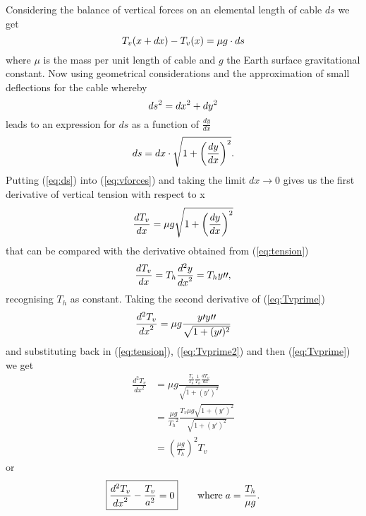 \documentclass[11pt]{amsart}
\begin{document}
Considering the balance of vertical forces on an elemental length of cable $ds$ we get
\begin{equation}
	\centering
	T_{v}(x+dx) - T_{v}(x) = \mu g \cdot ds
	\label{eq:vforces}
\end{equation}
where $\mu$ is the mass per unit length of cable and $g$ the Earth surface gravitational constant. Now
using geometrical considerations and the approximation of small deflections for the cable whereby
\begin{equation}
	\centering
	ds^2=dx^2+dy^2
	\label{eq:elemental}
\end{equation}
leads to an expression for $ds$ as a function of $\frac{dy}{dx}$
\begin{equation}
	\centering
	ds = dx \cdot \sqrt{1 + \left(\frac{dy}{dx}\right)^2}.
	\label{eq:ds}
\end{equation}
Putting (\ref{eq:ds}) into (\ref{eq:vforces}) and taking the limit $dx \to 0$ gives us the first derivative of vertical tension with respect to x
\begin{equation}
	\centering
	\frac{dT_{v}}{dx} = \mu g \sqrt{1 + \left(\frac{dy}{dx}\right)^2}
	\label{eq:Tvprime}
\end{equation}
that can be compared with the derivative obtained from (\ref{eq:tension})
\begin{equation}
	\centering
	\frac{dT_{v}}{dx} = T_{h} \frac{d^{2}y}{{dx}^2} = T_h y \prime \prime,
	\label{eq:Tvprime2}
\end{equation}
recognising $T_h$ as constant. Taking the second derivative of (\ref{eq:Tvprime})
\begin{equation}
	\centering
	\frac{d^{2}T_{v}}{{dx}^2} = \mu g \frac{y \prime y \prime \prime}{\sqrt{1 + (y \prime)^2}}
	\label{eq:Tvprimeprime}
\end{equation}
and substituting back in (\ref{eq:tension}), (\ref{eq:Tvprime2}) and then (\ref{eq:Tvprime}) we get
\begin{align*}
\frac{d^{2}T_{v}}{{dx}^2} &= \mu g \frac{\frac{T_v}{T_h} \frac{1}{T_h}\frac{dT_{v}}{dx}}{\sqrt{1 + (y \prime)^2}} \\
	&= \frac{\mu g}{{T_h}^2} \frac{T_v \mu g \sqrt{1 + (y \prime)^2}}{\sqrt{1 + (y \prime)^2}} \\
	&= \left(\frac{\mu g}{T_h}\right)^2 T_v
	\label{eq:Tvprimeprime2}
\end{align*}
or
\begin{equation}
	\centering
	\boxed{\frac{d^{2}T_{v}}{{dx}^2} - \frac{T_v}{a^2} = 0} \qquad \text{where} \; a=\frac{T_h}{\mu g}.
	\label{eq:main}
\end{equation}
\end{document}
